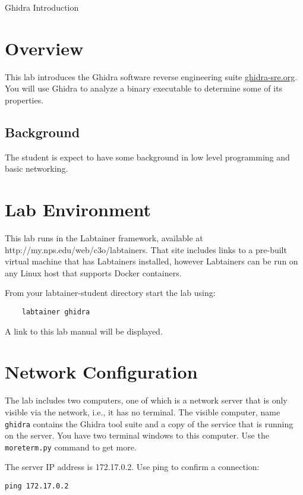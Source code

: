 


\begin{center}
{\LARGE Ghidra Introduction}
\vspace{0.1in}\\
\end{center}


\section{Overview}
This lab introduces the Ghidra software reverse engineering suite \url{ghidra-sre.org}.
You will use Ghidra to analyze a binary executable to determine some of its properties.

\subsection {Background}
The student is expect to have some background in low level programming and basic networking.

\section{Lab Environment}
This lab runs in the Labtainer framework,
available at http://my.nps.edu/web/c3o/labtainers.
That site includes links to a pre-built virtual machine
that has Labtainers installed, however Labtainers can
be run on any Linux host that supports Docker containers.

From your labtainer-student directory start the lab using:
\begin{verbatim}
    labtainer ghidra
\end{verbatim}
\noindent A link to this lab manual will be displayed.  

\section{Network Configuration}
The lab includes two computers, one of which is a network server that is
only visible via the network, i.e., it has no terminal.  The visible computer,
name {\tt ghidra} contains the Ghidra tool suite and a copy of the service that
is running on the server.  You have two terminal windows to this computer. Use the
{\tt moreterm.py} command to get more.

The server IP address is 172.17.0.2.  Use ping to confirm a connection:
\begin{verbatim}
ping 172.17.0.2
\end{verbatim}

